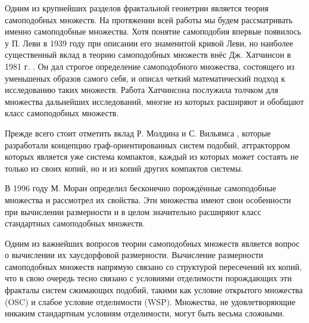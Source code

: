 Одним из крупнейших разделов фрактальной геоиетрии является теория самоподобных множеств.
На протяжении всей работы мы будем рассматривать именно самоподобные множества.
Хотя понятие самоподобия впервые появилось у П. Леви в 1939 году \cite{Levy1939} при описании его знаменитой кривой Леви, но наиболее существенный вклад в теорию самоподобных множеств внёс Дж. Хатчинсон в 1981 г. \cite{Hut}.
Он дал строгое определение самоподобного множества, состоящего из уменьшеных образов самого себя, и описал четкий математический подход к исследованию таких множеств. 
Работа Хатчинсона послужила толчком для множества дальнейших исследований, многие из которых расширяют и обобщают класс самоподобных множеств.

Прежде всего стоит отметить вклад Р. Молдина и С. Вильямса \cite{MW1981}, которые разработали концепцию граф-ориентированных систем подобий, аттракторром которых является уже система компактов, каждый из которых может состаять не только из своих копий, но и из копий других компактов системы.

В 1996 году М. Моран \cite{Moran1996} определил бесконечно порождённые самоподобные множества и рассмотрел их свойства.
Эти множества имеют свои особенности при вычислении размерности и в целом значительно расширяют класс стандартных самоподобных множеств.

Одним из важнейших вопросов теории самоподобных множеств является вопрос о вычислении их хаусдорфовой размерности.
Вычисление размерности самоподобных множеств напрямую связано со структурой пересечений их копий, что в свою очередь тесно связано с условиями отделимости порождающих эти фракталы систем сжимающих подобий, такими как условие открытого множества (OSC) и слабое условие отделимости (WSP).
Множества, не удовлетворяющие никаким стандартным условиям отделимости, могут быть весьма сложными.


